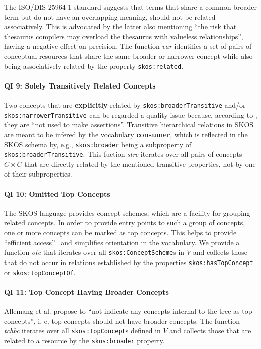 The ISO/DIS 25964-1 standard \cite{ISO25964-1:2011} suggests that terms that share a common broader term but do not have an overlapping meaning, should not be related associatively. This is advocated by \cite{Hedden2010,Aitchison2000} the latter also mentioning ``the risk that thesaurus compilers may overload the thesaurus with valueless relationships'', having a negative effect on precision.
The function \textit{var} identifies a set of pairs of conceptual resources that share the same broader or narrower concept while also being associatively related by the property \texttt{skos:related}.

\paragraph{QI 9: Solely Transitively Related Concepts}
Two concepts that are \textbf{explicitly} related by \texttt{skos:broaderTransitive} and/or \texttt{skos:narrowerTransitive} can be regarded a quality issue because, according to \cite{SkosReference2008}, they are ``not used to make assertions''. Transitive hierarchical relations in SKOS are meant to be infered by the vocabulary \textbf{consumer}, which is reflected in the SKOS schema by, e.g., \texttt{skos:broader} being a subproperty of \texttt{skos:broaderTransitive}. 
This fuction \textit{strc} iterates over all pairs of concepts $C \times C$ that are directly related by the mentioned transitive properties, not by one of their subproperties.

\paragraph{QI 10: Omitted Top Concepts}
The SKOS language provides concept schemes, which are a facility for grouping related concepts. In order to provide entry points to such a group of concepts, one or more concepts can be marked as top concepts. This helps to provide ``efficient access''~\cite{Isaac2009} and simplifies orientation in the vocabulary. 
We provide a function \textit{otc} that iterates over all \texttt{skos:ConceptScheme}s in $V$ and collects those that do not occur in relations established by the properties \texttt{skos:hasTopConcept} or \texttt{skos:topConceptOf}.

\paragraph{QI 11: Top Concept Having Broader Concepts}
Allemang et al. \cite{Allemang2011} propose to ``not indicate any concepts internal to the tree as top concepts'', i. e. top concepts should not have broader concepts. 
The function \textit{tchbc} iterates over all \texttt{skos:TopConcept}s defined in $V$ and collects those that are related to a resource by the \texttt{skos:broader} property.

